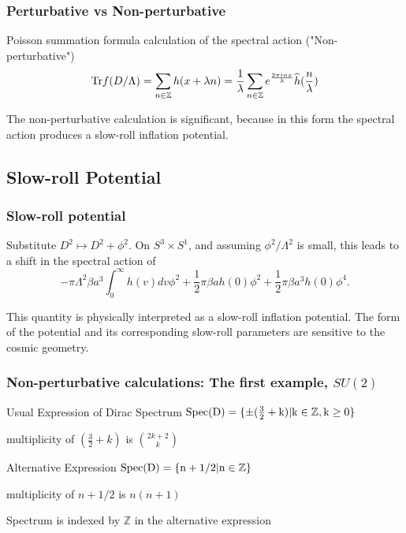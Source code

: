 \documentclass{beamer}
\def\Z{{\mathbb Z}}
\def\Tr{{\rm Tr}}
\begin{document}
\begin{frame}
  \frametitle{Perturbative vs Non-perturbative}
  \begin{block}{Poisson summation formula calculation of the spectral action ("Non-perturbative")}
    \[
      \Tr f (D/\Lambda) = \sum_{n \in \Z} h(x + \lambda n) = \frac{1}{\lambda} \sum_{n \in \Z} e^{\frac{2\pi i n x}{\lambda}}\widehat{h}(\frac{n}{\lambda})
    \]
  \end{block}
  \pause

  \begin{block}{}
	The non-perturbative calculation is significant, because in this form the spectral action produces a slow-roll inflation potential.
  \end{block}
\end{frame}

\subsection{Slow-roll Potential}
\begin{frame}
	\frametitle{Slow-roll potential}
	\begin{block}{}
		Substitute $D^2 \mapsto D^2 + \phi^2$. On $S^3 \times S^1$, and assuming $\phi^2 / \Lambda^2$ is small, this leads to a shift in the spectral action of
		\[
		-\pi \Lambda ^2 \beta a^3 \int_0^{\infty} h(v)dv \phi ^2 + \frac{1}{2} \pi \beta a h(0) \phi^2 + \frac{1}{2} \pi \beta a^3 h(0) \phi^4.
		\]
	\end{block}
	
	\begin{block}{}
		This quantity is physically interpreted as a slow-roll inflation potential.  The form of the potential and its corresponding slow-roll parameters are sensitive to the cosmic geometry.
	\end{block}
\end{frame}

\begin{frame}
  \frametitle{Non-perturbative calculations: The first example, $SU(2)$}
  \begin{block}{Usual Expression of Dirac Spectrum}
    $\rm{Spec}(D) = \{ \pm (\frac{3}{2} + k) | k \in \Z, k \geq 0\}$

    multiplicity of $(\frac{3}{2} + k)$ is $2 {k+2} \choose {k}$
  \end{block}

  \pause

  \begin{block}{Alternative Expression}
    $\rm{Spec}(D) = \{n + 1/2 | n \in \Z \}$

    multiplicity of $n + 1/2$ is $n(n+1)$
  \end{block}

  \begin{block}{}
   Spectrum is indexed by $\Z$ in the alternative expression
  \end{block}
\end{frame}
\end{document}
